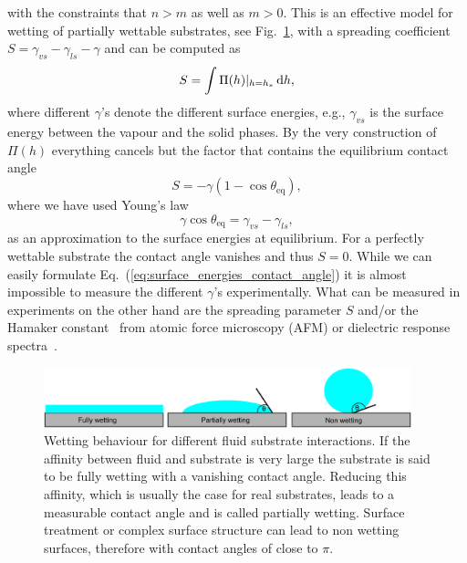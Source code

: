 with the constraints that $n>m$ as well as $m > 0$.
This is an effective model for wetting of partially wettable substrates, see Fig.~\ref{fig:wetting_angle}, with a spreading coefficient $S = \gamma_{vs} - \gamma_{ls} - \gamma$ and can be computed as~\cite{peschkaSignaturesSlipDewetting2019}
\begin{equation}\label{eq:disj_spreading}
    S = \int\Pi(h)|_{h=h_{\ast}} \mathop{}\!\mathrm{d} h, 
\end{equation}
where different $\gamma$'s denote the different surface energies, e.g., $\gamma_{vs}$ is the surface energy between the vapour and the solid phases.
By the very construction of $\Pi(h)$ everything cancels but the factor that contains the equilibrium contact angle  
\begin{equation}\label{eq:disj_young}
    S = -\gamma(1 - \cos\theta_{\text{eq}}),
\end{equation}\label{eq:Youngs_law}
where we have used Young's law~\cite{youngIIIEssayCohesion1805}
\begin{equation}\label{eq:surface_energies_contact_angle}
    \gamma\cos\theta_{\text{eq}} = \gamma_{vs} - \gamma_{ls},
\end{equation}
as an approximation to the surface energies at equilibrium.
For a perfectly wettable substrate the contact angle vanishes and thus $S=0$.
While we can easily formulate Eq.~(\ref{eq:surface_energies_contact_angle}) it is almost impossible to measure the different $\gamma$'s experimentally.
What can be measured in experiments on the other hand are the spreading parameter $S$ and/or the Hamaker constant~\cite{hamakerLondonVanWaals1937, bonnWettingSpreading2009, diezMetallicthinfilmInstabilitySpatially2016, peschkaSignaturesSlipDewetting2019} from atomic force microscopy (AFM) or dielectric response spectra~\cite{bergstromHamakerConstantsInorganic1997}. 
\begin{figure}
    \centering
    \includegraphics[width=0.95\textwidth]{graphics/Wettings.pdf}
    \caption{Wetting behaviour for different fluid substrate interactions.
    If the affinity between fluid and substrate is very large the substrate is said to be fully wetting with a vanishing contact angle.
    Reducing this affinity, which is usually the case for real substrates, leads to a measurable contact angle and is called partially wetting.
    Surface treatment or complex surface structure can lead to non wetting surfaces, therefore with contact angles of close to $\pi$.}
    \label{fig:wetting_angle}
\end{figure} 

